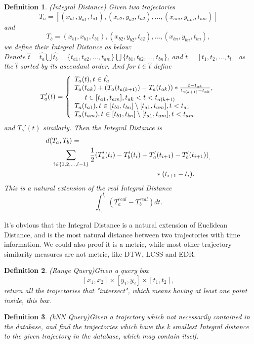 \documentclass[sigplan]{acmart}
\newtheorem{myDef}{Definition}
\begin{document}
\begin{myDef}
  (Integral Distance) Given two trajectories $$T_a=[(x_{a1}, y_{a1}, t_{a1}), (x_{a2}, y_{a2}, t_{a2}), ..., (x_{am}, y_{am}, t_{am})]$$ and $$T_b=(x_{b1}, x_{b1}, t_{b1}), (x_{b2}, y_{b2}, t_{b2}), ..., (x_{bn}, y_{bn}, t_{bn}), $$ we define their Integral Distance as below:\\
  Denote $\hat{t}=\hat{t_a}\bigcup\hat{t_b}=\{t_{a1}, t_{a2}, ..., t_{am}\}\bigcup \{t_{b1}, t_{b2}, ..., t_{bn}\}$, and $\check{t}=[t_1, t_2, ..., t_l]$ as the $\hat{t}$ sorted by its ascendant order. And for $t \in \hat{t}$ define
  $$T_a'(t)=\left\{
             \begin{array}{lr}
             T_a(t), t \in \hat{t_a} \\
             T_a(t_{ak})+ (T_a(t_{a(k+ 1)})-T_a(t_{ak}))* \frac{t-t_{ak}}{t_{a(k+ 1)}-t_{ak}}, \\
             \indent  t \in [t_{a1}, t_{am}], t_{ak}<t<t_{a(k+ 1)} \\
             T_a(t_{a1}), t \in [t_{b1}, t_{bn}] \setminus [t_{a1}, t_{am}], t< t_{a1} \\
             T_a(t_{am}), t \in [t_{b1}, t_{bn}] \setminus [t_{a1}, t_{am}], t< t_{am}
             \end{array}
    \right.$$
  and $T_b'(t)$ similarly. Then the Integral Distance is
  $$
  \begin{aligned}
  d(&T_a, T_b)=\\
  &\sum_{i \in \{1, 2, ..., l-1\}} \frac{1}{2} (T_a'(t_i)-T_b'(t_i)+ T_a'(t_{i+ 1})-T_b'(t_{i+ 1}))\\
  &\indent\indent\indent\indent\indent\indent\indent\indent\indent\indent* (t_{i+ 1}-t_i).
  \end{aligned}.
  $$
  This is a natural extension of the real Integral Distance
  $$\int_{t_1}^{t_l}(T_{a}^{real}-T_{b}^{real})dt.$$\par
\end{myDef}\par
It's obvious that the Integral Distance is a natural extension of Euclidean Distance, and is the most natural distance between two trajectories with time information. We could also proof it is a metric, while most other trajectory similarity measures are not metric, like DTW, LCSS and EDR.
\begin{myDef}
  (Range Query)Given a query box $$[x_1, x_2] \times [y_1, y_2] \times [t_1, t_2], $$return all the trajectories that "intersect", which means having at least one point inside, this box.
\end{myDef}
\begin{myDef}
  (kNN Query)Given a trajectory which not necessarily contained in the database, and find the trajectories which have the k smallest Integral distance to the given trajectory in the database, which may contain itself.
\end{myDef}
\end{document}
